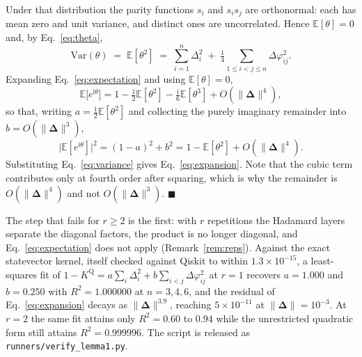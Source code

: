 Under that distribution the parity functions $s_i$ and $s_is_j$ are orthonormal:
each has mean zero and unit variance, and distinct ones are uncorrelated. Hence
$\mathbb{E}[\theta]=0$ and, by Eq.~\eqref{eq:theta},
\begin{equation}
\label{eq:variance}
  \mathrm{Var}(\theta) \;=\; \mathbb{E}[\theta^{2}]
  \;=\; \sum_{i=1}^{n}\Delta_i^{2}
  \;+\; \tfrac{1}{4}\!\!\sum_{1\le i<j\le n}\!\!\Delta\varphi_{ij}^{2}.
\end{equation}
Expanding Eq.~\eqref{eq:expectation} and using $\mathbb{E}[\theta]=0$,
\begin{equation*}
  \mathbb{E}\bigl[e^{\mathrm{i}\theta}\bigr]
  = 1 - \tfrac{1}{2}\mathbb{E}[\theta^{2}]
    - \tfrac{\mathrm{i}}{6}\mathbb{E}[\theta^{3}] + O(\|\bm{\Delta}\|^{4}),
\end{equation*}
so that, writing $a=\tfrac{1}{2}\mathbb{E}[\theta^{2}]$ and collecting the purely
imaginary remainder into $b=O(\|\bm{\Delta}\|^{3})$,
\begin{equation*}
  \bigl|\mathbb{E}[e^{\mathrm{i}\theta}]\bigr|^{2}
  = (1-a)^{2}+b^{2}
  = 1 - \mathbb{E}[\theta^{2}] + O(\|\bm{\Delta}\|^{4}).
\end{equation*}
Substituting Eq.~\eqref{eq:variance} gives Eq.~\eqref{eq:expansion}. Note that
the cubic term contributes only at fourth order after squaring, which is why the
remainder is $O(\|\bm{\Delta}\|^{4})$ and not $O(\|\bm{\Delta}\|^{3})$.
\hfill$\blacksquare$

The step that fails for $r\ge2$ is the first: with $r$ repetitions the
Hadamard layers separate the diagonal factors, the product is no longer
diagonal, and Eq.~\eqref{eq:expectation} does not apply
(Remark~\ref{rem:reps}). Against the exact statevector kernel, itself checked
against Qiskit to within $1.3\times10^{-15}$, a least-squares fit of
$1-K^{\mathrm{Q}} = a\sum_i\Delta_i^2 + b\sum_{i<j}\Delta\varphi_{ij}^2$ at
$r=1$ recovers $a=1.000$ and $b=0.250$ with $R^{2}=1.000000$ at $n=3,4,6$, and
the residual of Eq.~\eqref{eq:expansion} decays as $\|\bm{\Delta}\|^{3.9}$,
reaching $5\times10^{-11}$ at $\|\bm{\Delta}\|=10^{-3}$. At $r=2$ the same fit
attains only $R^{2}=0.60$ to $0.94$ while the unrestricted quadratic form still
attains $R^{2}=0.999996$. The script is released as
\texttt{runners/verify\_lemma1.py}.
